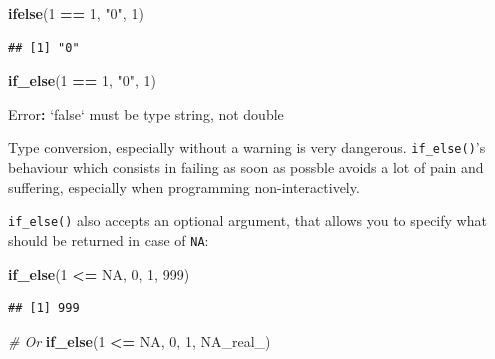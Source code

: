 \documentclass[]{gitbook}
\newenvironment{Shaded}{\begin{snugshade}}{\end{snugshade}}
\newcommand{\CommentTok}[1]{\textcolor[rgb]{0.56,0.35,0.01}{\textit{#1}}}
\newcommand{\DataTypeTok}[1]{\textcolor[rgb]{0.13,0.29,0.53}{#1}}
\newcommand{\DecValTok}[1]{\textcolor[rgb]{0.00,0.00,0.81}{#1}}
\newcommand{\KeywordTok}[1]{\textcolor[rgb]{0.13,0.29,0.53}{\textbf{#1}}}
\newcommand{\NormalTok}[1]{#1}
\newcommand{\OperatorTok}[1]{\textcolor[rgb]{0.81,0.36,0.00}{\textbf{#1}}}
\newcommand{\OtherTok}[1]{\textcolor[rgb]{0.56,0.35,0.01}{#1}}
\newcommand{\StringTok}[1]{\textcolor[rgb]{0.31,0.60,0.02}{#1}}
\theoremstyle{definition}
\theoremstyle{definition}
\theoremstyle{definition}
\theoremstyle{remark}
\begin{document}
\begin{Shaded}
\begin{Highlighting}[]
\KeywordTok{ifelse}\NormalTok{(}\DecValTok{1} \OperatorTok{==}\StringTok{ }\DecValTok{1}\NormalTok{, }\StringTok{"0"}\NormalTok{, }\DecValTok{1}\NormalTok{)}
\end{Highlighting}
\end{Shaded}

\begin{verbatim}
## [1] "0"
\end{verbatim}

\begin{Shaded}
\begin{Highlighting}[]
\KeywordTok{if_else}\NormalTok{(}\DecValTok{1} \OperatorTok{==}\StringTok{ }\DecValTok{1}\NormalTok{, }\StringTok{"0"}\NormalTok{, }\DecValTok{1}\NormalTok{)}
\end{Highlighting}
\end{Shaded}

\begin{Shaded}
\begin{Highlighting}[]
\NormalTok{Error}\OperatorTok{:}\StringTok{ `}\DataTypeTok{false}\StringTok{`}\NormalTok{ must be type string, not double}
\end{Highlighting}
\end{Shaded}

Type conversion, especially without a warning is very dangerous.
\texttt{if\_else()}'s behaviour which consists in failing as soon as
possble avoids a lot of pain and suffering, especially when programming
non-interactively.

\texttt{if\_else()} also accepts an optional argument, that allows you
to specify what should be returned in case of \texttt{NA}:

\begin{Shaded}
\begin{Highlighting}[]
\KeywordTok{if_else}\NormalTok{(}\DecValTok{1} \OperatorTok{<=}\StringTok{ }\OtherTok{NA}\NormalTok{, }\DecValTok{0}\NormalTok{, }\DecValTok{1}\NormalTok{, }\DecValTok{999}\NormalTok{)}
\end{Highlighting}
\end{Shaded}

\begin{verbatim}
## [1] 999
\end{verbatim}

\begin{Shaded}
\begin{Highlighting}[]
\CommentTok{# Or}
\KeywordTok{if_else}\NormalTok{(}\DecValTok{1} \OperatorTok{<=}\StringTok{ }\OtherTok{NA}\NormalTok{, }\DecValTok{0}\NormalTok{, }\DecValTok{1}\NormalTok{, }\OtherTok{NA_real_}\NormalTok{)}
\end{Highlighting}
\end{Shaded}
\end{document}
